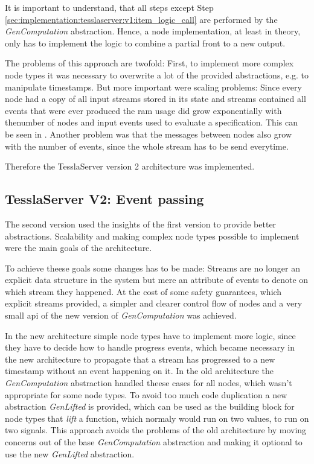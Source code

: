 It is important to understand, that all steps except Step \ref{sec:implementation:tesslaserver:v1:item_logic_call} are performed by the \emph{GenComputation} abstraction.
Hence, a node implementation, at least in theory, only has to implement the logic to combine a partial front to a new output.

The problems of this approach are twofold:
First, to implement more complex node types it was necessary to overwrite a lot of the provided abstractions, e.g. to manipulate timestamps.
But more important were scaling problems: Since every node had a copy of all input streams stored in its state and streams contained all events that were ever produced the \gls{ram} usage did grow exponentially with thenumber of nodes and input events used to evaluate a specification.
This can be seen in .
Another problem was that the messages between nodes also grow with the number of events, since the whole stream has to be send everytime.

Therefore the TesslaServer version 2 architecture was implemented.

\subsection{TesslaServer V2: Event passing}
\label{sec:implementation:tesslaserver:v2}

The second version used the insights of the first version to provide better abstractions.
Scalability and making complex node types possible to implement were the main goals of the architecture.

To achieve theese goals some changes has to be made:
Streams are no longer an explicit data structure in the system but mere an attribute of events to denote on which stream they happened.
At the cost of some safety guarantees, which explicit streams provided, a simpler and clearer control flow of nodes and a very small \gls{api} of the new version of \emph{GenComputation} was achieved.

In the new architecture simple node types have to implement more logic, since they have to decide how to handle progress events, which became necessary in the new architecture to propagate that a stream has progressed to a new timestamp without an event happening on it.
In the old architecture the \emph{GenComputation} abstraction handled theese cases for all nodes, which wasn't appropriate for some node types.
To avoid too much code duplication a new abstraction \emph{GenLifted} is provided, which can be used as the building block for node types that \emph{lift} a function, which normaly would run on two values, to run on two signals.
This approach avoids the problems of the old architecture by moving concerns out of the base \emph{GenComputation} abstraction and making it optional to use the new \emph{GenLifted} abstraction.

